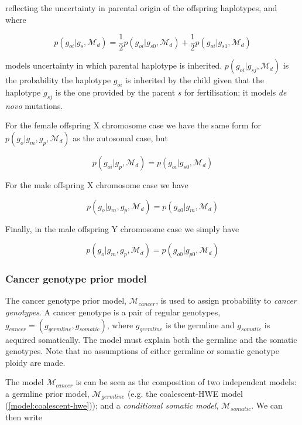 \documentclass{article}
\begin{document}
reflecting the uncertainty in parental origin of the offspring haplotypes, and where

\begin{equation}
p(g_{oi} |g_s, \mathcal{M}_{d}) = \frac{1}{2} p(g_{oi} | g_{s0}, \mathcal{M}_{d}) + \frac{1}{2} p(g_{oi} | g_{s1}, \mathcal{M}_{d})
\end{equation}

models uncertainty in which parental haplotype is inherited. $p(g_{oi} | g_{sj}, \mathcal{M}_{d})$ is the probability the haplotype $g_{oi}$ is inherited by the child given that the haplotype $g_{sj}$ is the one provided by the parent $s$ for fertilisation; it models \textit{de novo} mutations.

For the female offspring X chromosome case we have the same form for $p(g_o | g_m, g_p, \mathcal{M}_{d})$ as the autosomal case, but

\begin{equation}
p(g_{oi} | g_p, \mathcal{M}_{d}) = p(g_{oi} | g_{s0}, \mathcal{M}_{d})
\end{equation}

For the male offspring X chromosome case we have

\begin{equation}
 p(g_o | g_m, g_p, \mathcal{M}_{d}) = p(g_{o0} | g_m, \mathcal{M}_{d})
\end{equation}

Finally, in the male offspring Y chromosome case we simply have

\begin{equation}
 p(g_o | g_m, g_p, \mathcal{M}_{d}) = p(g_{o0} | g_{p0}, \mathcal{M}_{d})
\end{equation}

\subsubsection{Cancer genotype prior model}\label{model:cancer-prior}

The cancer genotype prior model, $\mathcal{M}_{cancer}$, is used to assign probability to \emph{cancer genotypes}. A cancer genotype is a pair of regular genotypes, $g_{cancer} = (g_{germline}, g_{somatic})$, where $g_{germline}$ is the germline and $g_{somatic}$ is acquired somatically. The model must explain both the germline and the somatic genotypes. Note that no assumptions of either germline or somatic genotype ploidy are made.

The model $\mathcal{M}_{cancer}$ is can be seen as the composition of two independent models: a germline prior model, $\mathcal{M}_{germline}$ (e.g. the coalescent-HWE model (\ref{model:coalescent-hwe})); and a \emph{conditional somatic model}, $\mathcal{M}_{somatic}$. We can then write
\end{document}
